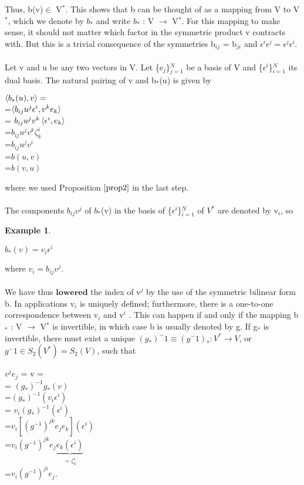 \documentclass[12pt,a4paper]{article}
\newtheorem{exmp}{Example}[section]
\begin{document}
Thus, b(v)$\in$ V$^*$. This shows that b can be thought of as a mapping from
V to V$^*$, which we denote by $b_*$ and write $b_*$ : V $\to$ V$^*$. For this mapping
to make sense, it should not matter which factor in the symmetric product v
contracts with. But this is a trivial consequence of the symmetries b$_{ij}$ = b$_{ji}$
and $\epsilon^i \epsilon^j = \epsilon^j \epsilon^i.$\\
\\Let v and u be any two vectors in V. Let  \{e$_j$\}$^N_{j=1}$ be a basis of V and \{$\epsilon^i$\}$^N_{i=1}$ its dual basis. The natural pairing of v and b$_*$(u) is given by
\begin{center}
$\braket{b_*(u), v} = $\\
=$\braket{b_{ij} u^j \epsilon^i, v^k e_k} $\\
= $b_{ij}u^j v^k \braket{\epsilon^i, e_k}$\\
=$b_{ij}u^j v^k \zeta^i_k$\\
=$b_{ij}u^j v^i$\\
=$b(u,v)$\\
=$b(v,u)$

\end{center}
where we used Proposition $\ref{prop2}$ in the last step.\\
\\
The components $b_{ij}v^{j}$ of $b_*$(v) in the basis of \{$\epsilon^i$\}$^N_{i=1}$ of $V^*$ are denoted by v$_i$, so
\begin{exmp} \label{eq1}
\begin{center}
$b_*(v) = v_i \epsilon^i$
\end{center}
\end{exmp}
where $v_i = b_{ij} v^j$.\\
\\
We have thus $\textbf{lowered}$ the index of v$^j$ by the use of the symmetric bilinear
form b. In applications v$_i$ is uniquely defined; furthermore, there is a one-to-one correspondence between v$_i$ and v$^i$
. This can happen if and only if the
mapping b$_*$ : V $\to$ V$^*$ is invertible, in which case b is usually denoted by g.
If g$_*$ is invertible, there must exist a unique $(g_*)^-1 \equiv (g^-1)_* : V^* \to V$, or $g^-1 \in S_2(V^*)= S_2(V)$, such that
\begin{center}

$v^j e_j$ = v = \\
= $(g_*)^{-1} g_*(v)$\\
=$(g_*)^{-1} (v_i \epsilon^i)$\\
= $v_i (g_*)^{-1}(\epsilon^i)$\\
=$v_i [ (g^{-1})^{jk} e_j e_k ]( \epsilon^i) $\\
=$v_i (g^{-1}) ^ {jk} e_j \underbrace{e_k (\epsilon^i)}_{= \zeta^i_k}$\\
=$v_i (g^{-1})^{ji} e_j$.
\end{center}
\end{document}
